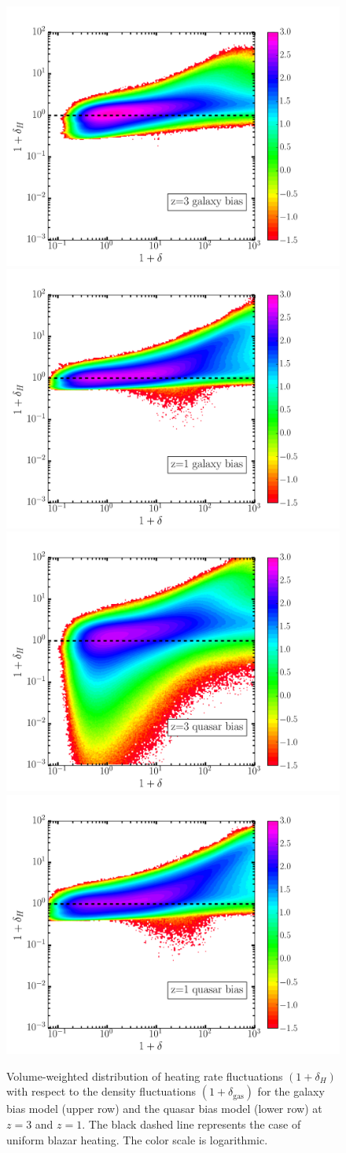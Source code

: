 \documentclass[numberedappendix]{emulateapj}
\begin{document}
\begin{figure}[h]
\centering
\includegraphics[width = .45\textwidth ]{delta_deltah_z3_gal_512.pdf}
\includegraphics[width = .45\textwidth ]{delta_deltah_z1_gal_512.pdf}\\
\includegraphics[width = .45\textwidth ]{delta_deltah_z3_qso_512.pdf}
\includegraphics[width = .45\textwidth ]{delta_deltah_z1_qso_512.pdf}
\caption{Volume-weighted distribution of heating rate fluctuations $(1+\delta_H)$ with respect to the density fluctuations $(1+\delta_{\mathrm{gas}})$ for the galaxy bias model (upper row) and the quasar bias model (lower row) at $z=3$ and $z=1$. The black dashed line represents the case of uniform blazar heating. The color scale is logarithmic.}
\label{fig:deltas}
\end{figure}
\end{document}
